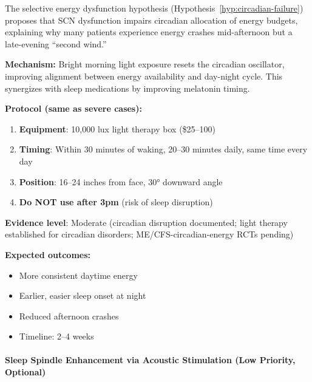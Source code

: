 \begin{keypoint}
The selective energy dysfunction hypothesis (Hypothesis~\ref{hyp:circadian-failure}) proposes that SCN dysfunction impairs circadian allocation of energy budgets, explaining why many patients experience energy crashes mid-afternoon but a late-evening ``second wind.''
\end{keypoint}

\begin{recommendation}
\label{rec:circadian-light-mild-moderate}

\textbf{Mechanism:} Bright morning light exposure resets the circadian oscillator, improving alignment between energy availability and day-night cycle. This synergizes with sleep medications by improving melatonin timing.

\textbf{Protocol (same as severe cases):}

\begin{enumerate}
    \item \textbf{Equipment}: 10,000 lux light therapy box (\$25--100)

    \item \textbf{Timing}: Within 30 minutes of waking, 20--30 minutes daily, same time every day

    \item \textbf{Position}: 16--24 inches from face, 30° downward angle

    \item \textbf{Do NOT use after 3pm} (risk of sleep disruption)
\end{enumerate}

\textbf{Evidence level}: Moderate (circadian disruption documented; light therapy established for circadian disorders; ME/CFS-circadian-energy RCTs pending)

\textbf{Expected outcomes:}
\begin{itemize}
    \item More consistent daytime energy
    \item Earlier, easier sleep onset at night
    \item Reduced afternoon crashes
    \item Timeline: 2--4 weeks
\end{itemize}

\end{recommendation}

\paragraph{Sleep Spindle Enhancement via Acoustic Stimulation (Low Priority, Optional)}

